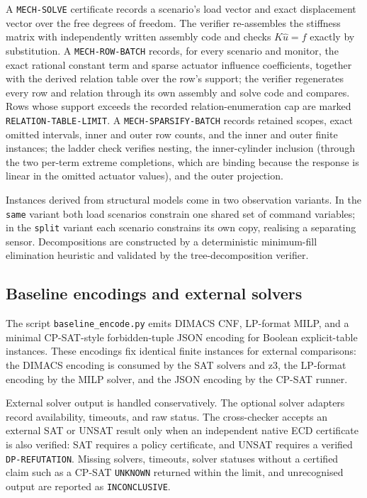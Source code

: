 A \texttt{MECH-SOLVE} certificate records a scenario's load vector and exact
displacement vector over the free degrees of freedom. The verifier re-assembles
the stiffness matrix with independently written assembly code and checks
$K\widehat u = f$ exactly by substitution. A \texttt{MECH-ROW-BATCH} records,
for every scenario and monitor, the exact rational constant term and sparse
actuator influence coefficients, together with the derived relation table over
the row's support; the verifier regenerates every row and relation through its
own assembly and solve code and compares. Rows whose support exceeds the
recorded relation-enumeration cap are marked
\texttt{RELATION-TABLE-LIMIT}. A \texttt{MECH-SPARSIFY-BATCH} records retained
scopes, exact omitted intervals, inner and outer row counts, and the inner and
outer finite instances; the ladder check verifies nesting, the inner-cylinder
inclusion (through the two per-term extreme completions, which are binding
because the response is linear in the omitted actuator values), and the outer
projection.

Instances derived from structural models come in two observation variants. In
the \texttt{same} variant both load scenarios constrain one shared set of
command variables; in the \texttt{split} variant each scenario constrains its
own copy, realising a separating sensor. Decompositions are constructed by a
deterministic minimum-fill elimination heuristic and validated by the
tree-decomposition verifier.

\subsection{Baseline encodings and external solvers}

The script \texttt{baseline\_encode.py} emits DIMACS CNF, LP-format MILP, and a
minimal CP-SAT-style forbidden-tuple JSON encoding for Boolean explicit-table
instances. These encodings fix identical finite instances for external
comparisons: the DIMACS encoding is consumed by the SAT solvers and z3, the
LP-format encoding by the MILP solver, and the JSON encoding by the CP-SAT
runner.

External solver output is handled conservatively. The optional solver adapters
record availability, timeouts, and raw status. The cross-checker accepts an
external SAT or UNSAT result only when an independent native ECD certificate is
also verified: SAT requires a policy certificate, and UNSAT requires a verified
\texttt{DP-REFUTATION}. Missing solvers, timeouts, solver statuses without a
certified claim such as a CP-SAT \texttt{UNKNOWN} returned within the limit, and
unrecognised output are
reported as \texttt{INCONCLUSIVE}.

